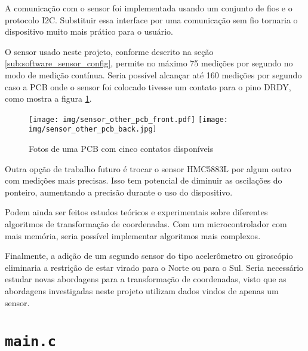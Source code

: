 \documentclass[brazil,pagestart=firstchapter]{abnt}
\begin{document}
A comunicação com o sensor foi implementada usando um conjunto de fios e o
protocolo \ac{I2C}. Substituir essa interface por uma comunicação sem fio
tornaria o dispositivo muito mais prático para o usuário.

O sensor usado neste projeto, conforme descrito na seção
\ref{sub:software_sensor_config}, permite no máximo 75 medições por segundo
no modo de medição contínua. Seria possível alcançar até 160 medições por
segundo caso a \ac{PCB} onde o sensor foi colocado tivesse um contato para o
pino DRDY, como mostra a figura \ref{fig:loveelectronics_photos}.

\begin{figure}[h]
\centering
\texttt{[image: img/sensor\_other\_pcb\_front.pdf]}
\texttt{[image: img/sensor\_other\_pcb\_back.jpg]}
\caption{Fotos de uma PCB com cinco contatos disponíveis}
\label{fig:loveelectronics_photos}
\end{figure}

Outra opção de trabalho futuro é trocar o sensor HMC5883L por algum outro
com medições mais precisas. Isso tem potencial de diminuir as oscilações do
ponteiro, aumentando a precisão durante o uso do dispositivo.

Podem ainda ser feitos estudos teóricos e experimentais sobre diferentes
algoritmos de transformação de coordenadas. Com um microcontrolador com mais
memória, seria possível implementar algoritmos mais complexos.

Finalmente, a adição de um segundo sensor do tipo acelerômetro ou giroscópio
eliminaria a restrição de estar virado para o Norte ou para o Sul. Seria
necessário estudar novas abordagens para a transformação de coordenadas,
visto que as abordagens investigadas neste projeto utilizam dados vindos de
apenas um sensor.








\apendice


\chapter{\texttt{main.c}}
\label{ape:main}

\end{document}
